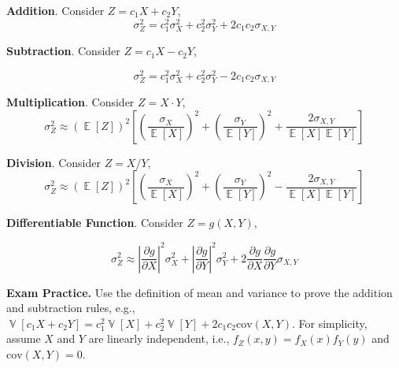 \documentclass[12pt,twoside]{article}
\DeclareMathOperator{\EX}{\mathbb{E}}%
\DeclareMathOperator{\VR}{\mathbb{V}}%
\begin{document}
\begin{minipage}{0.45\textwidth}
\textbf{Addition}. Consider $Z = c_1 X + c_2 Y$,
\begin{equation}
	\sigma_Z^2 = c_1^2 \sigma_X^2 + c_2^2 \sigma_Y^2 + 2 c_1 c_2 \sigma_{X,Y}
\end{equation}
\end{minipage} \quad
\begin{minipage}{0.55\textwidth}
\textbf{Subtraction}. Consider $Z = c_1 X - c_2 Y$,

\begin{equation}
	\sigma_Z^2 = c_1^2 \sigma_X^2 + c_2^2 \sigma_Y^2 - 2 c_1 c_2 \sigma_{X,Y}
\end{equation}
\end{minipage}

\vspace{18pt}

\textbf{Multiplication}. Consider $Z = X \cdot Y$,
\begin{equation}
	\sigma_Z^2\approx \left(\EX[Z]\right)^2 \left[ 
	\left(\frac{\sigma_{X}}{\EX[X]} \right)^2 + \left(\frac{\sigma_{Y}}{\EX[Y]} \right)^2 + \frac{2 \sigma_{X,Y}}{\EX[X] \EX[Y]}
	\right]
\end{equation}


\textbf{Division}. Consider $Z = X / Y$,
\begin{equation}
	\sigma_Z^2\approx \left(\EX[Z]\right)^2  \left[ 
	\left(\frac{\sigma_{X}}{\EX[X]} \right)^2 + \left(\frac{\sigma_{Y}}{\EX[Y]} \right)^2 - \frac{2 \sigma_{X,Y}}{\EX[X] \EX[Y]}
	\right]
\end{equation}

\vspace{6pt}

\textbf{Differentiable Function}. Consider $Z = g(X,Y)$, 

\begin{equation}
	\sigma_Z^2 \approx \left| \frac{\partial g}{\partial X} \right|^2 \sigma_X^2 + \left| \frac{\partial g}{\partial Y} \right|^2 \sigma_Y^2 + 2 \frac{\partial g}{\partial X} \frac{\partial g}{\partial Y} \sigma_{X,Y}
\end{equation}

\vspace{12pt}

\textbf{Exam Practice.} Use the definition of mean and variance to prove the addition and subtraction rules, e.g., $\VR[c_1 X+ c_2 Y] = c_1^2 \VR[X] + c_2^2 \VR[Y] + 2 c_1 c_2 \mathrm{cov}(X,Y)$. For simplicity, assume $X$ and $Y$ are linearly independent, i.e., $f_Z(x,y) = f_X(x) f_Y(y)$ and $\mathrm{cov}(X,Y) = 0$.
\end{document}
